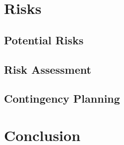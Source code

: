 \documentclass[a4paper,12pt]{article}
\begin{document}
\section{Risks}

\subsection{Potential Risks}


\subsection{Risk Assessment}


\subsection{Contingency Planning}


\section{Conclusion}
\end{document}
